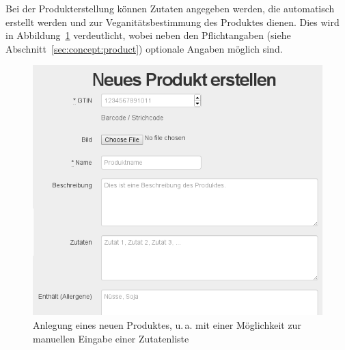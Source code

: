 Bei der Produkterstellung können Zutaten angegeben werden, die automatisch 
erstellt werden und zur Veganitätsbestimmung des Produktes dienen. Dies wird in 
Abbildung~\ref{img:new_product} verdeutlicht, wobei neben den Pflichtangaben 
(siehe Abschnitt~\ref{sec:concept:product}) optionale Angaben möglich sind.

\begin{figure}[ht]
  \centering
  \includegraphics[scale=0.5]{pics/new_product.png}
  \caption{Anlegung eines neuen Produktes, u.\,a. mit einer Möglichkeit zur 
manuellen Eingabe einer Zutatenliste}
  \label{img:new_product}
\end{figure}

